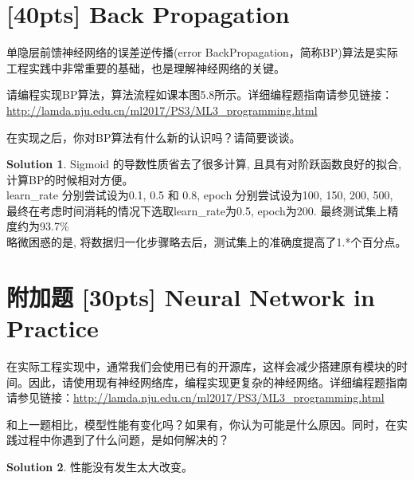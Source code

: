 \documentclass[a4paper,UTF8]{article}
\numberwithin{equation}{section}
\theoremstyle{definition}
\newtheorem*{solution}{Solution}
\begin{document}
\section{[40pts] Back Propagation} 
单隐层前馈神经网络的误差逆传播(error BackPropagation，简称BP)算法是实际工程实践中非常重要的基础，也是理解神经网络的关键。

请编程实现BP算法，算法流程如课本图5.8所示。详细编程题指南请参见链接：\url{http://lamda.nju.edu.cn/ml2017/PS3/ML3_programming.html}

在实现之后，你对BP算法有什么新的认识吗？请简要谈谈。
\begin{solution}

Sigmoid 的导数性质省去了很多计算, 且具有对阶跃函数良好的拟合, 计算BP的时候相对方便。 \\ 
learn\_rate 分别尝试设为0.1, 0.5 和 0.8, epoch 分别尝试设为100, 150, 200, 500, 最终在考虑时间消耗的情况下选取learn\_rate为0.5, epoch为200. 最终测试集上精度约为93.7\% \\
略微困惑的是, 将数据归一化步骤略去后，测试集上的准确度提高了1.*个百分点。

\end{solution}

\section*{附加题   [30pts] Neural Network in Practice}
在实际工程实现中，通常我们会使用已有的开源库，这样会减少搭建原有模块的时间。因此，请使用现有神经网络库，编程实现更复杂的神经网络。详细编程题指南请参见链接：\url{http://lamda.nju.edu.cn/ml2017/PS3/ML3_programming.html}

和上一题相比，模型性能有变化吗？如果有，你认为可能是什么原因。同时，在实践过程中你遇到了什么问题，是如何解决的？
\begin{solution}

性能没有发生太大改变。

\end{solution}
\end{document}
